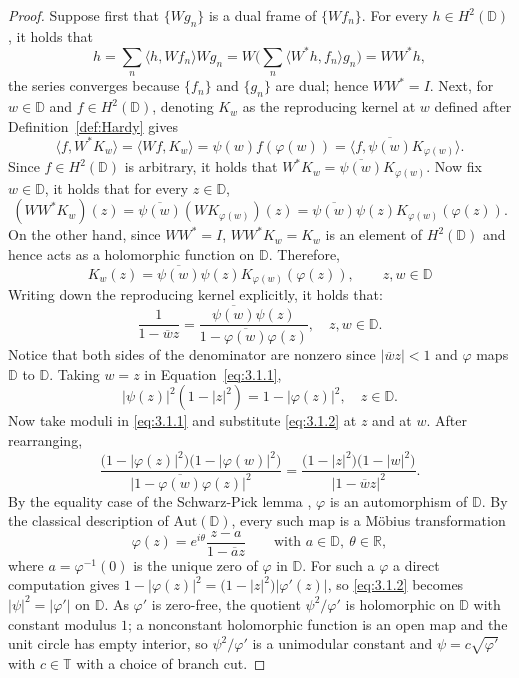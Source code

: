 \documentclass{amsart}
\theoremstyle{definition}
\theoremstyle{remark}
\numberwithin{equation}{section}
\newcommand{\R}{\mathbb{R}} %
\newcommand{\D}{\mathbb{D}} %
\newcommand{\T}{\mathbb{T}} %
\begin{document}
\begin{proof}
Suppose first that $\{ Wg_n \}$ is a dual frame of $\{ W f_n\}$. For every $h \in H^2(\D)$, it holds that
\begin{equation*}
    h = \sum_n \langle h,Wf_n\rangle Wg_n =W\Big( \sum_n \langle W^*h, f_n \rangle g_n \Big) =WW^*h,
\end{equation*}
the series converges because $\{ f_n\}$ and $\{g_n\}$ are dual; hence $WW^* = I$. Next, for $w \in \D$ and $f \in H^2(\D)$, denoting $K_w$ as the reproducing kernel at $w$ defined after Definition~\ref{def:Hardy} gives
\begin{equation*}
    \langle f, W^*K_w \rangle = \langle Wf, K_w \rangle =\psi(w)f(\varphi(w)) =\langle f, \overline{\psi(w)}K_{\varphi(w)}\rangle.
\end{equation*}
Since $f \in H^2(\D)$ is arbitrary, it holds that $W^*K_w = \overline{\psi(w)}K_{\varphi(w)}$. Now fix $w \in \D$, it holds that for every $z \in \D$,
\begin{equation*}
    (WW^* K_w)(z) = \overline{{\psi(w)}}(WK_{\varphi(w)})(z) = \overline{\psi(w)}\psi(z) K_{\varphi(w)}(\varphi(z)).
\end{equation*}
On the other hand, since $WW^* =I$, $WW^*K_w = K_w$ is an element of $H^2(\D)$ and hence acts as a holomorphic function on $\D$. Therefore,
$$K_w(z) = \overline{\psi(w)}\psi(z) K_{\varphi(w)}(\varphi(z)), \qquad z,w \in \D$$
Writing down the reproducing kernel explicitly, it holds that:
\begin{equation}\label{eq:3.1.1}
    \frac{1}{1-\overline{w}z} = \frac{\overline{\psi(w)}\psi(z)}{1- \overline{\varphi(w)}\varphi(z)}, \quad z,w\in \D.
\end{equation}
Notice that both sides of the denominator are nonzero since $|\overline{w}z|<1$ and $\varphi$ maps $\D$ to $\D$. Taking $w =z$ in Equation~\eqref{eq:3.1.1},
\begin{equation}\label{eq:3.1.2}
    |\psi(z)|^2 (1-|z|^2) = 1 -|\varphi(z)|^2, \quad z \in \D.
\end{equation}
Now take moduli in \eqref{eq:3.1.1} and substitute \eqref{eq:3.1.2} at $z$ and at
$w$. After rearranging,
\[
  \frac{\bigl(1-|\varphi(z)|^{2}\bigr)\bigl(1-|\varphi(w)|^{2}\bigr)}
       {\bigl|1-\overline{\varphi(w)}\varphi(z)\bigr|^{2}}
  =\frac{\bigl(1-|z|^{2}\bigr)\bigl(1-|w|^{2}\bigr)}
        {\bigl|1-\overline{w}z\bigr|^{2}} .
\]
By the equality case
of the Schwarz-Pick lemma \cite{ahlfors1979complex}, $\varphi$ is an automorphism of $\D$. By the classical description of $\text{Aut}(\D)$, every such map is a M\"obius transformation
\[
  \varphi(z)=e^{i\theta}\frac{z-a}{1-\overline{a}z}
  \qquad\text{with }a\in\D,\ \theta\in\R ,
\]
where $a=\varphi^{-1}(0)$ is the unique zero of $\varphi$ in $\D$. For such a
$\varphi$ a direct computation gives
$1-|\varphi(z)|^{2}=\bigl(1-|z|^{2}\bigr)|\varphi'(z)|$, so \eqref{eq:3.1.2}
becomes $|\psi|^{2}=|\varphi'|$ on $\D$.  As $\varphi'$ is zero-free, the
quotient $\psi^{2}/\varphi'$ is holomorphic on $\D$ with constant modulus $1$;
a nonconstant holomorphic function is an open map and the unit circle has empty
interior, so $\psi^{2}/\varphi'$ is a unimodular constant and
$\psi=c\sqrt{\varphi'}$ with $c\in\T$ with a choice of branch cut. 


\end{proof}
\end{document}
